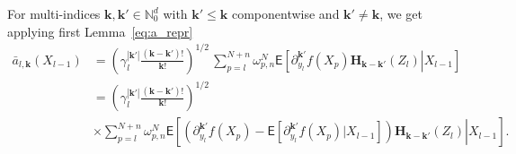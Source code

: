 \documentclass[bj]{imsart}
\begin{document}
For multi-indices $\mathbf k,\mathbf k'\in\mathbb N_0^d$
with $\mathbf k'\le\mathbf k$ componentwise
and $\mathbf k'\ne\mathbf k$,
we get applying first Lemma~\ref{eq:a_repr}
\begin{equation*}
\begin{split}
\bar a_{l,\mathbf{k}}(X_{l-1})
&=\left(\gamma_{l}^{|\mathbf{k}'|}\frac{(\mathbf{k}-\mathbf{k}')!}{\mathbf{k}!}\right)^{1/2}
\,\sum_{p=l}^{N+n}\omega_{p,n}^N
\mathsf E\left[\left.
\partial_{y_l}^{\mathbf{k}'}f(X_p)\mathbf{H}_{\mathbf{k}-\mathbf{k}'}(Z_l)\right|X_{l-1}\right]\\
&=\left(\gamma_{l}^{|\mathbf{k}'|}\frac{(\mathbf{k}-\mathbf{k}')!}{\mathbf{k}!}\right)^{1/2}
\\
&\times \sum_{p=l}^{N+n}\omega_{p,n}^N
\mathsf E\left[\left.
\left(
\partial_{y_l}^{\mathbf{k}'}f(X_p)-\mathsf E\left[\partial_{y_l}^{\mathbf{k}'}f(X_p)|X_{l-1}\right]
\right)
\mathbf{H}_{\mathbf{k}-\mathbf{k}'}(Z_l)\right|X_{l-1}\right].
\end{split}
\end{equation*}
\end{document}

